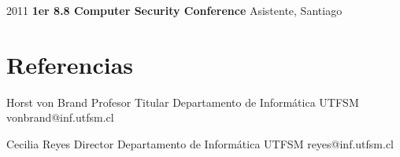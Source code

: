 \documentclass[11pt,a4paper,sans]{moderncv}
\begin{document}
\cvitem
        {2011}
        {\textbf{1er 8.8 Computer Security Conference}
        Asistente, Santiago}

\section{Referencias}

\cventry{}
        {Horst von Brand}
        {Profesor Titular Departamento de Informática}
        {UTFSM}
        {}
        {vonbrand@inf.utfsm.cl}


\cventry{}
        {Cecilia Reyes}
        {Director Departamento de Informática}
        {UTFSM}
        {}
        {reyes@inf.utfsm.cl}


\clearpage
\end{document}
